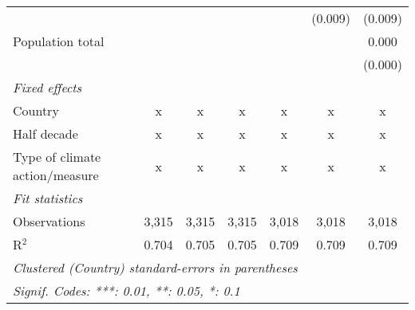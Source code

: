 \begin{tabular}{lcccccc}
                                                           &         &               &               &               & (0.009)       & (0.009)\\   
   Population total                                        &         &               &               &               &               & 0.000\\   
                                                           &         &               &               &               &               & (0.000)\\   
   \emph{Fixed effects}\\
   Country                                                 & x       & x             & x             & x             & x             & x\\  
   Half decade                                             & x       & x             & x             & x             & x             & x\\  
   Type of climate action/measure                          & x       & x             & x             & x             & x             & x\\  
   \midrule \emph{Fit statistics}\\
   Observations                                            & 3,315   & 3,315         & 3,315         & 3,018         & 3,018         & 3,018\\  
   R$^2$                                                   & 0.704   & 0.705         & 0.705         & 0.709         & 0.709         & 0.709\\  
   \midrule
   \multicolumn{7}{l}{\emph{Clustered (Country) standard-errors in parentheses}}\\
   \multicolumn{7}{l}{\emph{Signif. Codes: ***: 0.01, **: 0.05, *: 0.1}}\\
\end{tabular}
\par\endgroup


